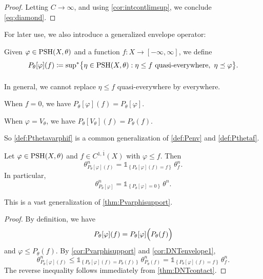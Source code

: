 \begin{proof}
    Letting $C\to\infty$, and using \cref{cor:intcontlimsup}, we conclude \eqref{eq:diamond}.
\end{proof}


For later use, we also introduce a generalized envelope operator:
\begin{definition}\label{def:Pthetavarphif}
Given $\varphi\in\mathrm{PSH}(X,\theta)$ and a function $f\colon X\to[-\infty,\infty]$, we define
\[
P_\theta[\varphi](f)\coloneqq \operatorname*{sup}_{}{}\!{}^{*} \bigl\{\eta\in\mathrm{PSH}(X,\theta): \eta\leq f\textup{ quasi-everywhere},\ \eta\preceq\varphi\bigr\}.
\]
\end{definition}
In general, we cannot replace $\eta\leq f$ quasi-everywhere by everywhere.


\begin{example}\label{ex:envelopes:L625}
    When $f=0$, we have $P_\theta[\varphi](f)=P_{\theta}[\varphi]$.

    When $\varphi=V_{\theta}$, we have $P_\theta[V_{\theta}](f)=P_{\theta}(f)$.

    So \cref{def:Pthetavarphif} is a common generalization of \cref{def:Penv} and \cref{def:Pthetaf}.
\end{example}


\begin{proposition}\label{prop:DNTenvelope2}
    Let $\varphi\in\mathrm{PSH}(X,\theta)$ and $f\in C^{1,\overline{1}}(X)$ with $\varphi\leq f$. Then
    \[
    \theta^n_{P_\theta[\varphi](f)} = \mathds{1}_{\left\{P_\theta[\varphi](f)=f\right\}}\,\theta^n_f.
    \]
    In particular,
    \[
    \theta^n_{P_\theta[\varphi]} = \mathds{1}_{\left\{P_\theta[\varphi]=0\right\}}\,\theta^n.
    \]
\end{proposition}
This is a vast generalization of \cref{thm:Pvarphisupport}.
\begin{proof}
    By definition, we have
    \[
    P_\theta[\varphi](f)=P_\theta[\varphi]\Bigl(P_\theta(f)\Bigr)
    \]
    and $\varphi\leq P_\theta(f)$. By \cref{cor:Pvarphisupport} and \cref{cor:DNTenvelope1},
    \[
        \theta^n_{P_\theta[\varphi](f)} \leq \mathds{1}_{\left\{P_\theta[\varphi](f)=P_\theta(f)\right\}}\,\theta^n_{P_\theta(f)} = \mathds{1}_{\left\{P_\theta[\varphi](f)=f\right\}}\,\theta^n_f.
    \]
    The reverse inequality follows immediately from \cref{thm:DNTcontact}.
\end{proof}



